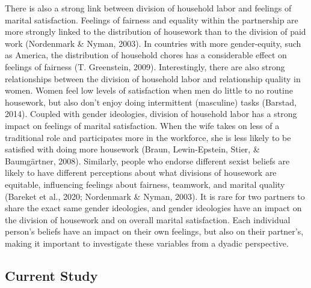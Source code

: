 \documentclass[
  man]{apa6}
\begin{document}
There is also a strong link between division of household labor and feelings of marital satisfaction. Feelings of fairness and equality within the partnership are more strongly linked to the distribution of housework than to the division of paid work (Nordenmark \& Nyman, 2003). In countries with more gender-equity, such as America, the distribution of household chores has a considerable effect on feelings of fairness (T. Greenstein, 2009). Interestingly, there are also strong relationships between the division of household labor and relationship quality in women. Women feel low levels of satisfaction when men do little to no routine housework, but also don't enjoy doing intermittent (masculine) tasks (Barstad, 2014). Coupled with gender ideologies, division of household labor has a strong impact on feelings of marital satisfaction. When the wife takes on less of a traditional role and participates more in the workforce, she is less likely to be satisfied with doing more housework (Braun, Lewin-Epstein, Stier, \& Baumgärtner, 2008). Similarly, people who endorse different sexist beliefs are likely to have different perceptions about what divisions of housework are equitable, influencing feelings about fairness, teamwork, and marital quality (Bareket et al., 2020; Nordenmark \& Nyman, 2003). It is rare for two partners to share the exact same gender ideologies, and gender ideologies have an impact on the division of housework and on overall marital satisfaction. Each individual person's beliefs have an impact on their own feelings, but also on their partner's, making it important to investigate these variables from a dyadic perspective.

\hypertarget{current-study}{%
\subsection{Current Study}\label{current-study}}
\end{document}
